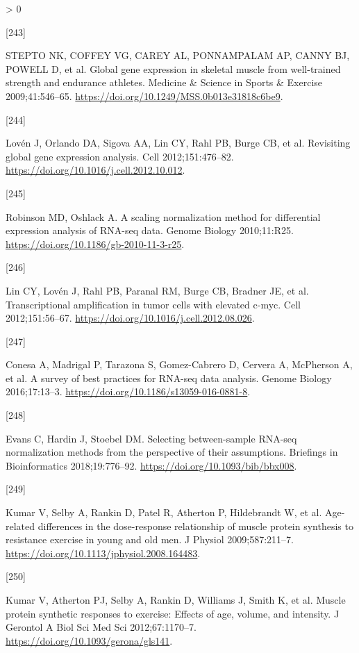 \documentclass[twoside,10pt]{gihclass} %
\newlength{\cslhangindent}
\newlength{\csllabelwidth}
\newenvironment{CSLReferences}[3] %
 {%
  \setlength{\parindent}{0pt}
  \ifodd #1 \everypar{\setlength{\hangindent}{\cslhangindent}}\ignorespaces\fi
  \ifnum #2 > 0
  \setlength{\parskip}{#2\baselineskip}
  \fi
 }%
 {}
\newcommand{\CSLLeftMargin}[1]{\parbox[t]{\maxof{\widthof{#1}}{\csllabelwidth}}{#1}}
\newcommand{\CSLRightInline}[1]{\parbox[t]{\linewidth}{#1}}
\begin{document}
\begin{CSLReferences}{0}{0}
\leavevmode\hypertarget{ref-RN2398}{}%
\CSLLeftMargin{{[}243{]} }
\CSLRightInline{STEPTO NK, COFFEY VG, CAREY AL, PONNAMPALAM AP, CANNY BJ, POWELL D, et al. Global gene expression in skeletal muscle from well-trained strength and endurance athletes. Medicine \& Science in Sports \& Exercise 2009;41:546--65. \url{https://doi.org/10.1249/MSS.0b013e31818c6be9}.}

\leavevmode\hypertarget{ref-RN2359}{}%
\CSLLeftMargin{{[}244{]} }
\CSLRightInline{Lovén J, Orlando DA, Sigova AA, Lin CY, Rahl PB, Burge CB, et al. Revisiting global gene expression analysis. Cell 2012;151:476--82. \url{https://doi.org/10.1016/j.cell.2012.10.012}.}

\leavevmode\hypertarget{ref-RN2414}{}%
\CSLLeftMargin{{[}245{]} }
\CSLRightInline{Robinson MD, Oshlack A. A scaling normalization method for differential expression analysis of RNA-seq data. Genome Biology 2010;11:R25. \url{https://doi.org/10.1186/gb-2010-11-3-r25}.}

\leavevmode\hypertarget{ref-RN2430}{}%
\CSLLeftMargin{{[}246{]} }
\CSLRightInline{Lin CY, Lovén J, Rahl PB, Paranal RM, Burge CB, Bradner JE, et al. Transcriptional amplification in tumor cells with elevated c-myc. Cell 2012;151:56--67. \url{https://doi.org/10.1016/j.cell.2012.08.026}.}

\leavevmode\hypertarget{ref-RN2426}{}%
\CSLLeftMargin{{[}247{]} }
\CSLRightInline{Conesa A, Madrigal P, Tarazona S, Gomez-Cabrero D, Cervera A, McPherson A, et al. A survey of best practices for RNA-seq data analysis. Genome Biology 2016;17:13--3. \url{https://doi.org/10.1186/s13059-016-0881-8}.}

\leavevmode\hypertarget{ref-RN2878}{}%
\CSLLeftMargin{{[}248{]} }
\CSLRightInline{Evans C, Hardin J, Stoebel DM. Selecting between-sample RNA-seq normalization methods from the perspective of their assumptions. Briefings in Bioinformatics 2018;19:776--92. \url{https://doi.org/10.1093/bib/bbx008}.}

\leavevmode\hypertarget{ref-RN2720}{}%
\CSLLeftMargin{{[}249{]} }
\CSLRightInline{Kumar V, Selby A, Rankin D, Patel R, Atherton P, Hildebrandt W, et al. Age-related differences in the dose-response relationship of muscle protein synthesis to resistance exercise in young and old men. J Physiol 2009;587:211--7. \url{https://doi.org/10.1113/jphysiol.2008.164483}.}

\leavevmode\hypertarget{ref-RN2716}{}%
\CSLLeftMargin{{[}250{]} }
\CSLRightInline{Kumar V, Atherton PJ, Selby A, Rankin D, Williams J, Smith K, et al. Muscle protein synthetic responses to exercise: Effects of age, volume, and intensity. J Gerontol A Biol Sci Med Sci 2012;67:1170--7. \url{https://doi.org/10.1093/gerona/gls141}.}


\end{CSLReferences}
\end{document}

